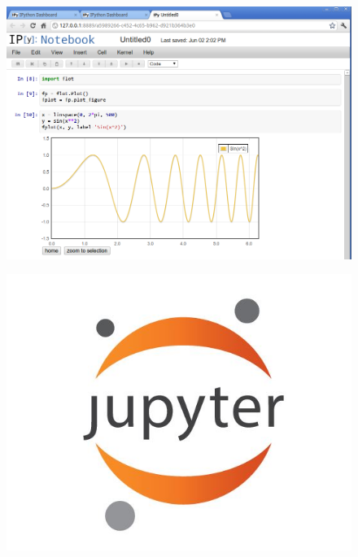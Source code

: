 \documentclass[MASTER.tex]{subfiles}
\begin{document}
\begin{frame}
	
	\begin{figure}
\centering
\includegraphics[width=0.9\linewidth]{vk2Q6}

\end{figure}

\end{frame}

\begin{frame}
	
	\begin{figure}
\centering
\includegraphics[width=0.7\linewidth]{jupyter}
\caption{}
\label{fig:jupyter}
\end{figure}

\end{frame}
	
\end{document}
